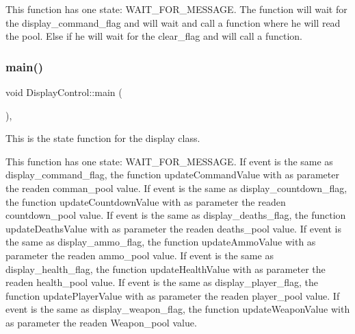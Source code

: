 This function has one state\+: W\+A\+I\+T\+\_\+\+F\+O\+R\+\_\+\+M\+E\+S\+S\+A\+GE. The function will wait for the display\+\_\+command\+\_\+flag and will wait and call a function where he will read the pool. Else if he will wait for the clear\+\_\+flag and will call a function. \mbox{\label{class_display_control_a9707c32249e0a648afc2def818900f30}} 
\subsubsection{\texorpdfstring{main()}{main()}\hspace{0.1cm}{\footnotesize\ttfamily [2/2]}}
{\footnotesize\ttfamily void Display\+Control\+::main (\begin{DoxyParamCaption}{ }\end{DoxyParamCaption})\hspace{0.3cm}{\ttfamily [inline]}, {\ttfamily [override]}}



This is the state function for the display class. 

This function has one state\+: W\+A\+I\+T\+\_\+\+F\+O\+R\+\_\+\+M\+E\+S\+S\+A\+GE. If event is the same as display\+\_\+command\+\_\+flag, the function update\+Command\+Value with as parameter the readen comman\+\_\+pool value. If event is the same as display\+\_\+countdown\+\_\+flag, the function update\+Countdown\+Value with as parameter the readen countdown\+\_\+pool value. If event is the same as display\+\_\+deaths\+\_\+flag, the function update\+Deaths\+Value with as parameter the readen deaths\+\_\+pool value. If event is the same as display\+\_\+ammo\+\_\+flag, the function update\+Ammo\+Value with as parameter the readen ammo\+\_\+pool value. If event is the same as display\+\_\+health\+\_\+flag, the function update\+Health\+Value with as parameter the readen health\+\_\+pool value. If event is the same as display\+\_\+player\+\_\+flag, the function update\+Player\+Value with as parameter the readen player\+\_\+pool value. If event is the same as display\+\_\+weapon\+\_\+flag, the function update\+Weapon\+Value with as parameter the readen Weapon\+\_\+pool value. \mbox{\label{class_display_control_ae2d8d0f502941d859639fd46ddd8924b}} 
